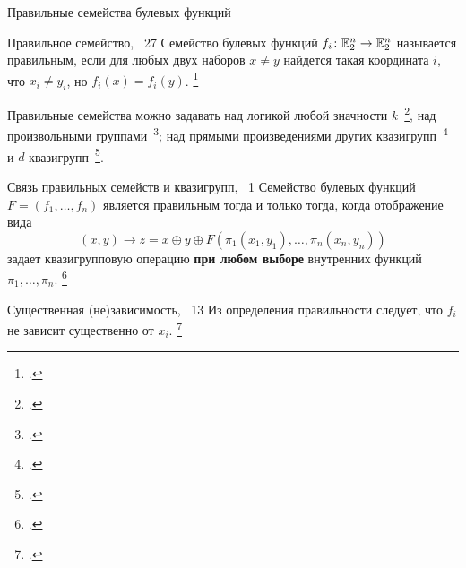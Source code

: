 \begin{frame}{Правильные семейства булевых функций}
    \begin{myexample}{Правильное семейство, ~27}
        Семейство булевых функций $f_i \colon \mathbb{E}_2^n \to \mathbb{E}_2^n$ называется правильным, если для любых двух наборов $x \ne y$ найдется такая координата $i$, что $x_i \ne y_i$, но $f_i(x) = f_i(y)$.
        \footcitetext{nosov98, nosov99}
    \end{myexample}
    \pause 

    Правильные семейства можно задавать над логикой любой значности $k$~\footcite{nosov06}, над произвольными группами~\footcite{nosov06abel}; над прямыми произведениями других квазигрупп~\footcite{galatenko2020latin} и $d$-квазигрупп~\footcite{plaksina14}.
\end{frame}


\begin{frame}
    \begin{mypropos}{Связь правильных семейств и квазигрупп, \propos~1}
        Семейство булевых функций $F = (f_1, \ldots, f_n)$ является правильным тогда и только тогда, когда отображение вида 
        \[
            (x, y) \to z = x \oplus y \oplus F(\pi_1(x_1, y_1), \ldots, \pi_n(x_n, y_n))
        \]
        задает квазигрупповую операцию \textbf{при любом выборе} внутренних функций $\pi_1, \ldots, \pi_n$.
        \footcitetext{nosov99}
    \end{mypropos}

    \pause 
    \begin{mypropos}{Существенная (не)зависимость, \rema~13}
        Из определения правильности следует, что $f_i$ не зависит существенно от $x_i$.
        \footcitetext{nosov98}
    \end{mypropos}
\end{frame}


